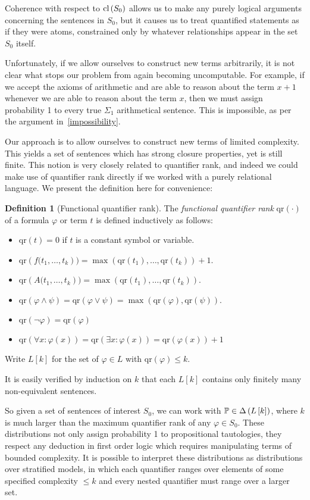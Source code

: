 \documentclass[12pt]{article}
\theoremstyle{definition}
\newtheorem{definition}{Definition}
\newcommand{\of}[1]{\left(#1\right)}
\newcommand{\PP}{\mathbb{P}}
\newcommand{\vp}{\varphi}
\begin{document}
Coherence with respect to $\clS$ allows us to make any purely logical arguments
concerning the sentences in $S_0$, but it causes us to treat
quantified statements as if they were atoms,
constrained only by whatever relationships appear in the set $S_0$ itself.

Unfortunately, if we allow ourselves to construct new terms
arbitrarily,
it is not clear what stops our problem from again becoming uncomputable.
For example, if we accept the axioms of arithmetic
and are able to reason about the term $x+1$ whenever we are able
to reason about the term $x$,
then we must assign probability 1 to every true $\Sigma_1$
arithmetical sentence.
This is impossible, as per the argument in~\ref{impossibility}.

Our approach is to allow ourselves to construct new terms
of limited complexity.
This yields a set of sentences which has strong closure
properties, yet is still finite.
This notion is very closely related to quantifier rank,
and indeed we could make use of quantifier rank
directly if we worked with a purely relational language.
We present the definition here for convenience:
\newcommand{\qr}[1]{\text{qr}\of{#1}}
\newcommand{\Lk}[1]{L\left[#1\right]}
\begin{definition}[Functional quantifier rank]%
The \emph{functional quantifier rank} $\qr{\cdot}$ of a formula $\vp$ or term $t$
is defined inductively as follows:
\begin{itemize}
\item $\qr{t} = 0$ if $t$ is a constant symbol or variable.
\item $\qr{f(t_1, \ldots, t_k}) = \max\of{\qr{t_1}, \ldots, \qr{t_k}} + 1$.
\item $\qr{A(t_1, \ldots, t_k}) = \max\of{\qr{t_1}, \ldots, \qr{t_k}}$.
\item $\qr{\vp \wedge \psi} = \qr{\vp \vee \psi} = \max\of{\qr{\vp}, \qr{\psi}}$.
\item $\qr{\neg \vp} = \qr{\vp}$
\item $\qr{\forall x : \vp\of{x}} = \qr{\exists x : \vp\of{x}} = \qr{\vp\of{x}}+1$
\end{itemize}
Write $\Lk{k}$ for the set of $\vp \in L$ with $\qr{\vp} \leq k$.
\end{definition}
It is easily verified by induction on $k$ that each $\Lk{k}$
contains only finitely many non-equivalent sentences.

So given a set of sentences of interest $S_0$,
we can work with $\PP \in \D{\Lk{k}}$,
where $k$ is much larger than the maximum quantifier rank of any $\vp \in S_0$.
These distributions not only assign probability 1 to propositional
tautologies,
they respect any deduction in first order logic
which requires manipulating terms
of bounded complexity.
It is possible to interpret these distributions
as distributions over stratified models,
in which each quantifier
ranges over elements of some specified complexity $\leq k$
and every nested quantifier must range over a larger set.
\end{document}
